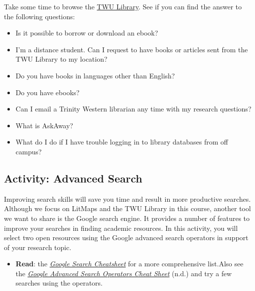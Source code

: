 \documentclass[
  letterpaper,
  DIV=11,
  numbers=noendperiod]{scrreprt}
\providecommand{\tightlist}{%
  \setlength{\itemsep}{0pt}\setlength{\parskip}{0pt}}\usepackage{longtable,booktabs,array}
\begin{document}
\begin{tcolorbox}
\begin{tcolorbox}
Take some time to browse the
\href{https://www.twu.ca/academics/library}{TWU Library}. See if you can
find the answer to the following questions:

\begin{itemize}
\tightlist
\item
  Is it possible to borrow or download an ebook?
\item
  I'm a distance student. Can I request to have books or articles sent
  from the TWU Library to my location?
\item
  Do you have books in languages other than English?
\item
  Do you have ebooks?
\item
  Can I email a Trinity Western librarian any time with my research
  questions?
\item
  What is AskAway?
\item
  What do I do if I have trouble logging in to library databases from
  off campus?
\end{itemize}

\end{tcolorbox}

\subsection{Activity: Advanced Search}\label{activity-advanced-search}

\begin{tcolorbox}[enhanced jigsaw, toprule=.15mm, colback=white, colframe=quarto-callout-note-color-frame, bottomtitle=1mm, leftrule=.75mm, coltitle=black, titlerule=0mm, rightrule=.15mm, colbacktitle=quarto-callout-note-color!10!white, left=2mm, title={Learning Activity}, opacitybacktitle=0.6, opacityback=0, breakable, toptitle=1mm, arc=.35mm, bottomrule=.15mm]

Improving search skills will save you time and result in more productive
searches. Although we focus on LitMaps and the TWU Library in this
course, another tool we want to share is the Google search engine. It
provides a number of features to improve your searches in finding
academic resources. In this activity, you will select two open resources
using the Google advanced search operators in support of your research
topic.

\begin{itemize}
\tightlist
\item
  \textbf{Read}: the
  \href{https://www.webfx.com/blog/seo/google-advanced-search-operators-cheat-sheet/}{\emph{Google
  Search Cheatsheet}} for a more comprehensive list.Also see the
  \href{https://quickref.me/google-search.html}{\emph{Google Advanced
  Search Operators Cheat Sheet}} (n.d.) and try a few searches using the
  operators.
\end{itemize}


\end{tcolorbox}
\end{tcolorbox}
\end{document}
